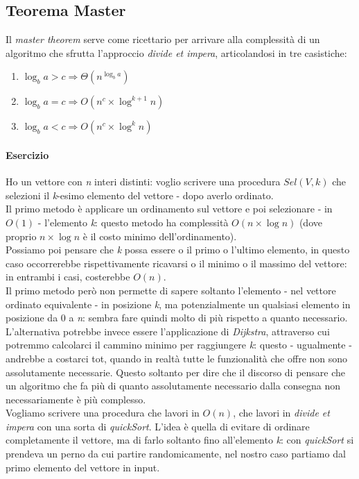 \subsection{Teorema Master}
Il \textit{master theorem} serve come ricettario per arrivare alla complessità di un algoritmo che sfrutta l'approccio \textit{divide et impera}, articolandosi in tre casistiche:
\begin{enumerate}
	\item $\log_{b}{a} > c \Rightarrow \Theta(n^{\log_{b}{a}})$
	\item $\log_{b}{a} = c \Rightarrow O(n^c\times \log^{k+1}{n})$
	\item $\log_{b}{a} < c \Rightarrow O(n^c\times \log^k{n})$
\end{enumerate}

\paragraph{Esercizio}
Ho un vettore con \textit{n} interi distinti: voglio scrivere una procedura $Sel(V,k)$ che selezioni il \textit{k}-esimo elemento del vettore - dopo averlo ordinato. \\
Il primo metodo è applicare un ordinamento sul vettore e poi selezionare - in $O(1)$ - l'elemento \textit{k}: questo metodo ha complessità $O(n\times \log{n})$ (dove proprio $n \times \log{n}$ è il costo minimo dell'ordinamento). \\
Possiamo poi pensare che \textit{k} possa essere o il primo o l'ultimo elemento, in questo caso occorrerebbe rispettivamente ricavarsi o il minimo o il massimo del vettore: in entrambi i casi, costerebbe $O(n)$. \\
Il primo metodo però non permette di sapere soltanto l'elemento - nel vettore ordinato equivalente - in posizione \textit{k}, ma potenzialmente un qualsiasi elemento in posizione da 0 a \textit{n}: sembra fare quindi molto di più rispetto a quanto necessario. \\
L'alternativa potrebbe invece essere l'applicazione di \textit{Dijkstra}, attraverso cui potremmo calcolarci il cammino minimo per raggiungere \textit{k}: questo - ugualmente - andrebbe a costarci tot, quando in realtà tutte le funzionalità che offre non sono assolutamente necessarie.
Questo soltanto per dire che il discorso di pensare che un algoritmo che fa più di quanto assolutamente necessario dalla consegna non necessariamente è più complesso. \\
Vogliamo scrivere una procedura che lavori in $O(n)$, che lavori in \textit{divide et impera} con una sorta di \textit{quickSort}. L'idea è quella di evitare di ordinare completamente il vettore, ma di farlo soltanto fino all'elemento \textit{k}: con \textit{quickSort} si prendeva un perno da cui partire randomicamente, nel nostro caso partiamo dal primo elemento del vettore in input.
